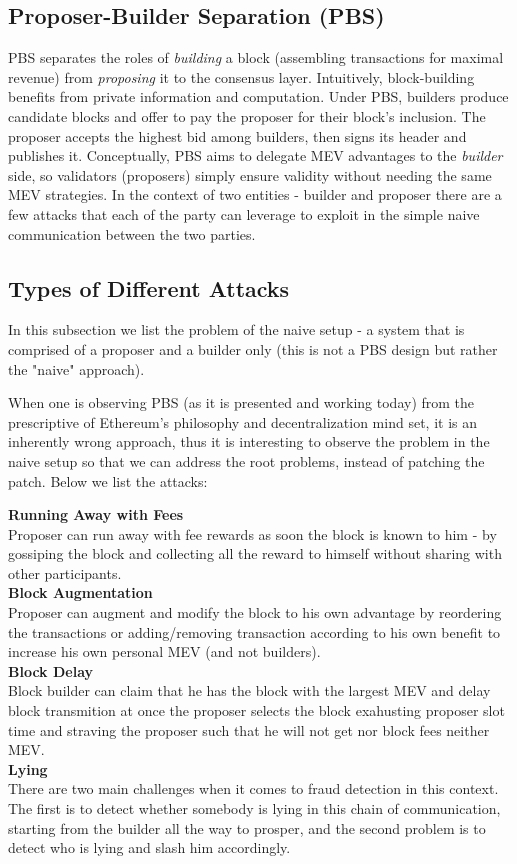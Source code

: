 \documentclass[11pt]{article}
\begin{document}
\subsection{Proposer-Builder Separation (PBS)}
PBS separates the roles of \emph{building} a block (assembling transactions for maximal revenue) from \emph{proposing} it to the consensus layer.  Intuitively, block-building benefits from private information and computation. Under PBS, builders produce candidate blocks and offer to pay the proposer for their block’s inclusion. The proposer accepts the highest bid among builders, then signs its header and publishes it. Conceptually, PBS aims to delegate MEV advantages to the \textit{builder} side, so validators (proposers) simply ensure validity without needing the same MEV strategies. In the context of two entities - builder and proposer there are a few attacks that each of the party can leverage to exploit in the simple naive communication between the two parties.

\subsection{Types of Different Attacks}
\label{subsection:types-of-different-attack}
In this subsection we list the problem of the naive setup - a system that is comprised of a proposer and a builder only (this is not a PBS design but rather the "naive" approach).

When one is observing PBS (as it is presented and working today) from the prescriptive of Ethereum's philosophy and decentralization mind set, it is an inherently wrong approach, thus it is interesting to observe the problem in the naive setup so that we can address the root problems, instead of patching the patch. Below we list the attacks:

\noindent\textbf{Running Away with Fees}\\[4pt]
Proposer can run away with fee rewards as soon the block is known to him - by gossiping the block and collecting all the reward to himself without sharing with other participants. 
\\[8pt]
\noindent\textbf{Block Augmentation}\\[4pt]
Proposer can augment and modify the block to his own advantage by reordering the transactions or adding/removing transaction according to his own benefit to increase his own personal MEV (and not builders).
\\[8pt]
\noindent\textbf{Block Delay}\\[4pt]
Block builder can claim that he has the block with the largest MEV and delay block transmition at once the proposer selects the block exahusting proposer slot time and straving the proposer such that he will not get nor block fees neither MEV.
\\[8pt]
\noindent\textbf{Lying}\\[4pt]
There are two main challenges when it comes to fraud detection in this context. The first is to detect whether somebody is lying in this chain of communication, starting from the builder all the way to prosper, and the second problem is to detect who is lying and slash him accordingly.
\end{document}
